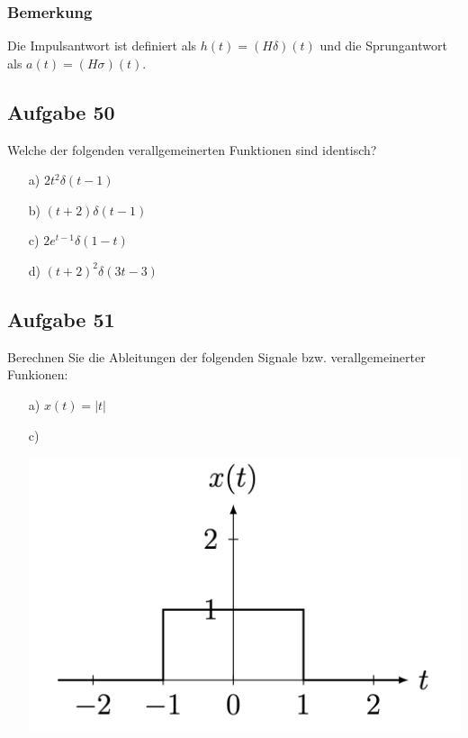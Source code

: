 \documentclass[11pt]{article}
\begin{document}
\vfill \null
\pagebreak

\subsubsection*{Bemerkung}
\vspace*{-0.5cm}
Die Impulsantwort ist definiert als $h(t) = (H \delta)(t)$ und die Sprungantwort als $a(t) = (H\sigma)(t)$.\\
%

\subsection*{Aufgabe 50}
\vspace*{-0.5cm}
Welche der folgenden verallgemeinerten Funktionen sind identisch?
\begin{multicols}{2}
\begin{itemize}
    \item[a)] $2t^2 \delta(t-1)$
    \item[b)] $(t+2)\delta(t-1)$
    \item[c)] $2e^{t-1}\delta(1-t)$
    \item[d)] $(t+2)^2 \delta(3t-3)$
\end{itemize}
\end{multicols}
\vspace*{-0.5cm}

\vspace*{-0.5cm}
\subsection*{Aufgabe 51}
\vspace*{-0.5cm}
Berechnen Sie die Ableitungen der folgenden Signale bzw. verallgemeinerter Funkionen:
\vspace*{-0.5cm}
\begin{itemize}
    \item[a)] $x(t) = |t|$
    \item[c)]
    \item[] \vspace{-0.75cm}\includegraphics[width=0.3\linewidth]{docimgs/51c).png}
\end{itemize}

\end{document}
